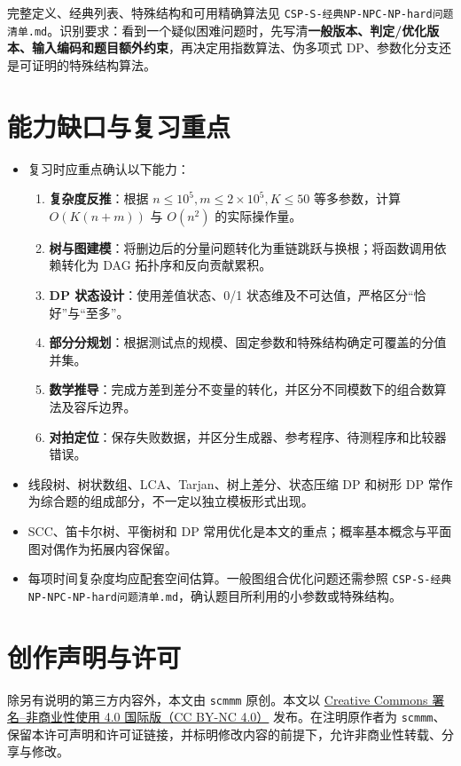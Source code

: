 \documentclass[a4paper,11pt]{article}
\newcommand{\code}[1]{\texttt{#1}}
\begin{document}
完整定义、经典列表、特殊结构和可用精确算法见 \code{CSP-S-经典NP-NPC-NP-hard问题清单.md}。识别要求：看到一个疑似困难问题时，先写清\textbf{一般版本、判定/优化版本、输入编码和题目额外约束}，再决定用指数算法、伪多项式 DP、参数化分支还是可证明的特殊结构算法。

\newpage
\section{能力缺口与复习重点}

\begin{itemize}
  \item 复习时应重点确认以下能力：
        \begin{enumerate}
          \item \textbf{复杂度反推}：根据 $n\le10^5,m\le2\times10^5,K\le50$ 等多参数，计算 $O(K(n+m))$ 与 $O(n^2)$ 的实际操作量。
          \item \textbf{树与图建模}：将删边后的分量问题转化为重链跳跃与换根；将函数调用依赖转化为 DAG 拓扑序和反向贡献累积。
          \item \textbf{DP 状态设计}：使用差值状态、0/1 状态维及不可达值，严格区分“恰好”与“至多”。
          \item \textbf{部分分规划}：根据测试点的规模、固定参数和特殊结构确定可覆盖的分值并集。
          \item \textbf{数学推导}：完成方差到差分不变量的转化，并区分不同模数下的组合数算法及容斥边界。
          \item \textbf{对拍定位}：保存失败数据，并区分生成器、参考程序、待测程序和比较器错误。
        \end{enumerate}
  \item 线段树、树状数组、LCA、Tarjan、树上差分、状态压缩 DP 和树形 DP 常作为综合题的组成部分，不一定以独立模板形式出现。
  \item SCC、笛卡尔树、平衡树和 DP 常用优化是本文的重点；概率基本概念与平面图对偶作为拓展内容保留。
  \item 每项时间复杂度均应配套空间估算。一般图组合优化问题还需参照 \code{CSP-S-经典NP-NPC-NP-hard问题清单.md}，确认题目所利用的小参数或特殊结构。
\end{itemize}

\medskip
\section*{创作声明与许可}

除另有说明的第三方内容外，本文由 \texttt{scmmm} 原创。本文以
\href{https://creativecommons.org/licenses/by-nc/4.0/deed.zh-hans}{Creative Commons 署名--非商业性使用 4.0 国际版（CC BY-NC 4.0）}
发布。在注明原作者为 \texttt{scmmm}、保留本许可声明和许可证链接，并标明修改内容的前提下，允许非商业性转载、分享与修改。
\end{document}
